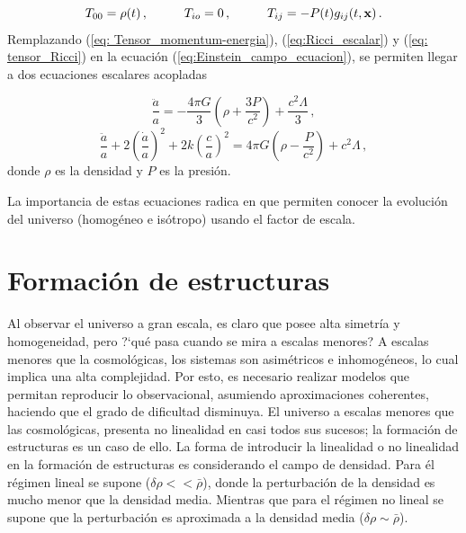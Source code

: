 \begin{equation}
T_{00}= \rho(t)\,, \hspace{1cm} T_{io}=0\,, \hspace{1cm} T_{ij}=-P(t)g_{ij}(t,\bf{x})\,.
\label{eq: Tensor_momentum-energia}
\end{equation}
%
Remplazando (\ref{eq: Tensor_momentum-energia}), (\ref{eq:Ricci_escalar}) y (\ref{eq: tensor_Ricci}) en la ecuación (\ref{eq:Einstein_campo_ecuacion}), se permiten llegar a dos ecuaciones escalares acopladas

\begin{equation}
\frac{\ddot{a}}{a} = -\frac{4\pi G}{3}\left(\rho + \frac{3P}{c^{2}} \right) + \frac{c^{2}\Lambda}{3}\,,
\end{equation}
\begin{equation}
\frac{\ddot{a}}{a}+2 \left(\frac{\dot{a}}{a}\right)^{2} + 2k\left(\frac{c}{a} \right)^{2} =4\pi G\left( \rho - \frac{P}{c^{2}}\right)+ c^{2}\Lambda\,,
\end{equation}
%
donde $\rho$ es la densidad y $P$ es la presión.

La importancia de estas ecuaciones radica en que permiten conocer la evolución del universo (homogéneo e isótropo) usando el factor de escala. 


\section{Formación de estructuras}
\label{sec: Estructure_Formation}




Al observar el universo a gran escala, es claro que posee alta simetría y homogeneidad, pero ?`qué pasa cuando se mira a escalas menores? A escalas menores que la cosmológicas, los sistemas son asimétricos e inhomogéneos, lo cual implica una alta complejidad. Por esto, es necesario realizar modelos que permitan reproducir lo observacional, asumiendo aproximaciones coherentes,  haciendo que el grado de dificultad disminuya. El universo a escalas menores que las cosmológicas, presenta no linealidad en casi todos sus sucesos; la formación de estructuras es un caso de ello. La forma de introducir la linealidad o no linealidad en la formación de estructuras es considerando el campo de densidad. Para él régimen lineal se supone ($\delta\rho << \bar{\rho}$), donde la perturbación de la densidad es mucho menor que la densidad media. Mientras que para el régimen no lineal se supone que la perturbación es aproximada a la densidad media ($\delta\rho \sim \bar{\rho}$).


